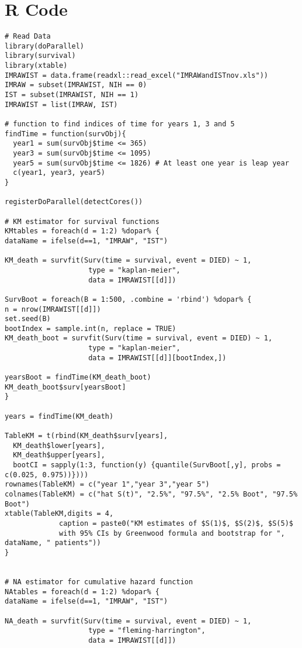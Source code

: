 \documentclass[11pt]{article}
\begin{document}
\appendix

\section{R Code}

\begin{lstlisting}
# Read Data
library(doParallel)
library(survival)
library(xtable)
IMRAWIST = data.frame(readxl::read_excel("IMRAWandISTnov.xls"))
IMRAW = subset(IMRAWIST, NIH == 0)
IST = subset(IMRAWIST, NIH == 1)
IMRAWIST = list(IMRAW, IST)

# function to find indices of time for years 1, 3 and 5
findTime = function(survObj){
  year1 = sum(survObj$time <= 365)
  year3 = sum(survObj$time <= 1095)
  year5 = sum(survObj$time <= 1826) # At least one year is leap year
  c(year1, year3, year5)
}

registerDoParallel(detectCores())

# KM estimator for survival functions
KMtables = foreach(d = 1:2) %dopar% {
dataName = ifelse(d==1, "IMRAW", "IST")

KM_death = survfit(Surv(time = survival, event = DIED) ~ 1,
                    type = "kaplan-meier",
                    data = IMRAWIST[[d]])

SurvBoot = foreach(B = 1:500, .combine = 'rbind') %dopar% {
n = nrow(IMRAWIST[[d]])
set.seed(B)
bootIndex = sample.int(n, replace = TRUE)
KM_death_boot = survfit(Surv(time = survival, event = DIED) ~ 1,
                    type = "kaplan-meier",
                    data = IMRAWIST[[d]][bootIndex,])

yearsBoot = findTime(KM_death_boot)
KM_death_boot$surv[yearsBoot]
}

years = findTime(KM_death)

TableKM = t(rbind(KM_death$surv[years],
  KM_death$lower[years],
  KM_death$upper[years],
  bootCI = sapply(1:3, function(y) {quantile(SurvBoot[,y], probs = c(0.025, 0.975))})))
rownames(TableKM) = c("year 1","year 3","year 5")
colnames(TableKM) = c("hat S(t)", "2.5%", "97.5%", "2.5% Boot", "97.5% Boot")
xtable(TableKM,digits = 4, 
             caption = paste0("KM estimates of $S(1)$, $S(2)$, $S(5)$
             with 95% CIs by Greenwood formula and bootstrap for ", dataName, " patients"))
}


# NA estimator for cumulative hazard function
NAtables = foreach(d = 1:2) %dopar% {
dataName = ifelse(d==1, "IMRAW", "IST")

NA_death = survfit(Surv(time = survival, event = DIED) ~ 1,
                    type = "fleming-harrington",
                    data = IMRAWIST[[d]])


\end{lstlisting}
\end{document}
